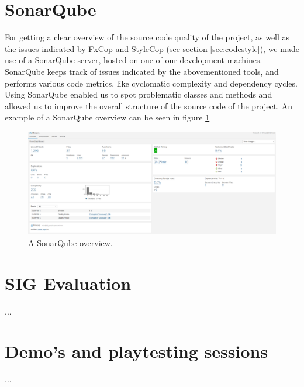 	\section{SonarQube} \label{sec:sonarqube}
		For getting a clear overview of the source code quality of the project, as 
		well as the issues indicated by FxCop and StyleCop (see section 
		\ref{sec:codestyle}), we made use of a SonarQube server, hosted on one of 
		our development machines. SonarQube keeps track of issues indicated by 
		the abovementioned tools, and performs various code metrics, like cyclomatic 
		complexity and dependency cycles. Using SonarQube enabled us to spot 
		problematic classes and methods and allowed us to improve the overall 
		structure of the source code of the project. An example of a SonarQube
		overview can be seen in figure \ref{fig:sonarqube}
		
		\begin{figure}[!ht]
			\centering
			\includegraphics[width=\textwidth]{SonarQube}
			\caption{A SonarQube overview.}
			\label{fig:sonarqube}
		\end{figure}
		
	\section{SIG Evaluation} \label{sec:sigevaluation}
		...
		
	\section{Demo's and playtesting sessions} \label{sec:demos}
		...
